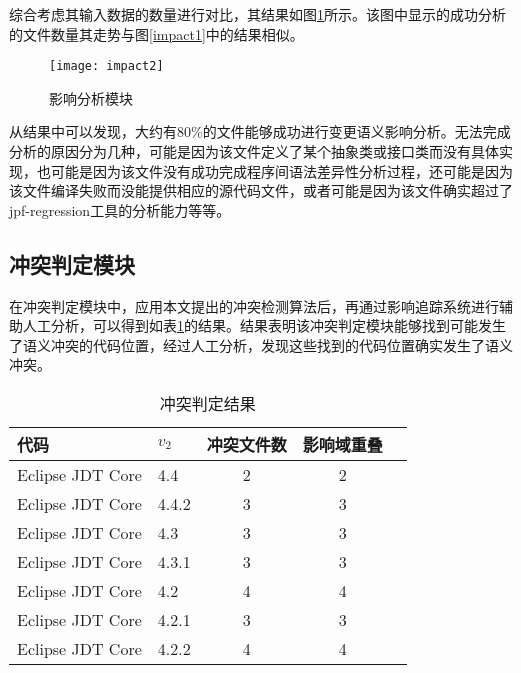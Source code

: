 综合考虑其输入数据的数量进行对比，其结果如图\ref {impact2}所示。该图中显示的成功分析的文件数量其走势与图\ref {impact1}中的结果相似。

\begin{figure}
	\centering
	\texttt{[image: impact2]}
	\caption {影响分析模块}
	\label {impact2}	
\end{figure}

从结果中可以发现，大约有80\%的文件能够成功进行变更语义影响分析。无法完成分析的原因分为几种，可能是因为该文件定义了某个抽象类或接口类而没有具体实现，也可能是因为该文件没有成功完成程序间语法差异性分析过程，还可能是因为该文件编译失败而没能提供相应的源代码文件，或者可能是因为该文件确实超过了jpf-regression工具的分析能力等等。

\subsection{冲突判定模块}

在冲突判定模块中，应用本文提出的冲突检测算法后，再通过影响追踪系统进行辅助人工分析，可以得到如表\ref {data_compatible}的结果。结果表明该冲突判定模块能够找到可能发生了语义冲突的代码位置，经过人工分析，发现这些找到的代码位置确实发生了语义冲突。

\begin{table}[H]
	\caption{冲突判定结果}
	\label{data_compatible}
	\centering
	\begin{tabular}{llccc}
		\toprule[1.5pt]
		{\heiti 代码} & {\heiti $v_2$} & {\heiti 冲突文件数} & {\heiti 影响域重叠}  \\\midrule[1pt]
		Eclipse JDT Core & 4.4 	& 2 & 2 \\
		Eclipse JDT Core & 4.4.2 & 3 & 3 \\
		Eclipse JDT Core & 4.3 	& 3 & 3 \\
		Eclipse JDT Core & 4.3.1 & 3 & 3 \\
		Eclipse JDT Core & 4.2 	& 4 & 4 \\
		Eclipse JDT Core & 4.2.1 & 3  &	3 \\
		Eclipse JDT Core & 4.2.2 & 4 & 4 \\
		\bottomrule[1.5pt]
	\end{tabular}
\end{table}

